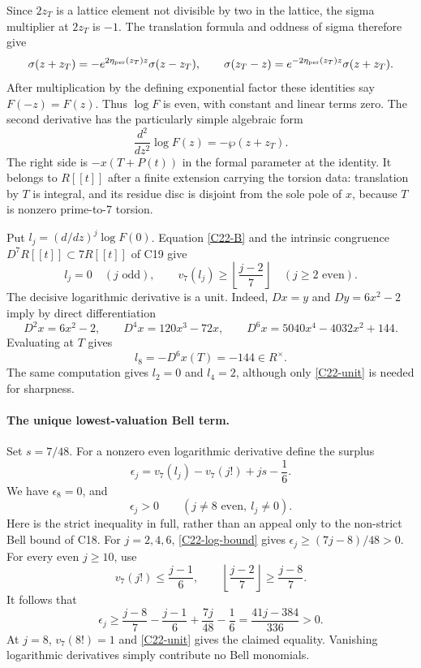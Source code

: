 Since $2z_T$ is a lattice element not divisible by two in the
lattice, the sigma multiplier at $2z_T$ is $-1$.
The translation formula and oddness of sigma therefore give
\[
 \sigma(z+z_T)
     =-e^{2\eta_{\rm per}(z_T)z}\sigma(z-z_T),
 \qquad
 \sigma(z_T-z)
     =e^{-2\eta_{\rm per}(z_T)z}\sigma(z+z_T).
\]
After multiplication by the defining exponential factor these
identities say $F(-z)=F(z)$.  Thus $\log F$ is even, with
constant and linear terms zero.
The second derivative has the particularly simple algebraic form
\begin{equation}\label{C22-B}
 \frac{d^2}{dz^2}\log F(z)=-\wp(z+z_T).
\end{equation}
The right side is $-x(T+P(t))$ in the formal parameter at the
identity.  It belongs to $R[[t]]$ after a finite extension
carrying the torsion data: translation by $T$ is integral,
and its residue disc is disjoint from the sole pole of $x$,
because $T$ is nonzero prime-to-7 torsion.

Put $l_j=(d/dz)^j\log F(0)$.  Equation \eqref{C22-B}
and the intrinsic congruence $D^7R[[t]]\subset7R[[t]]$ of
C19 give
\begin{equation}\label{C22-log-bound}
 l_j=0\quad(j\text{ odd}),\qquad
 v_7(l_j)\geq\left\lfloor\frac{j-2}{7}\right\rfloor
       \quad(j\geq2\text{ even}).
\end{equation}
The decisive logarithmic derivative is a unit.  Indeed,
$Dx=y$ and $Dy=6x^2-2$ imply by direct differentiation
\[
 D^2x=6x^2-2,\qquad
 D^4x=120x^3-72x,\qquad
 D^6x=5040x^4-4032x^2+144.
\]
Evaluating at $T$ gives
\begin{equation}\label{C22-unit}
 l_8=-D^6x(T)=-144\in R^\times.
\end{equation}
The same computation gives $l_2=0$ and $l_4=2$, although
only \eqref{C22-unit} is needed for sharpness.

\paragraph{The unique lowest-valuation Bell term.}
Set $s=7/48$.  For a nonzero even logarithmic derivative
define the surplus
\[
 \epsilon_j=v_7(l_j)-v_7(j!)+js-\frac16.
\]
We have $\epsilon_8=0$, and
\begin{equation}\label{C22-strict}
 \epsilon_j>0\qquad(j\ne8\text{ even},\ l_j\ne0).
\end{equation}
Here is the strict inequality in full, rather than an appeal
only to the non-strict Bell bound of C18.
For $j=2,4,6$, \eqref{C22-log-bound} gives
$\epsilon_j\geq(7j-8)/48>0$.
For every even $j\geq10$, use
\[
 v_7(j!)\leq\frac{j-1}{6},\qquad
 \left\lfloor\frac{j-2}{7}\right\rfloor
       \geq\frac{j-8}{7}.
\]
It follows that
\[
 \epsilon_j\geq
   \frac{j-8}{7}-\frac{j-1}{6}
          +\frac{7j}{48}-\frac16
      =\frac{41j-384}{336}>0.
\]
At $j=8$, $v_7(8!)=1$ and \eqref{C22-unit} gives the
claimed equality.  Vanishing logarithmic derivatives simply
contribute no Bell monomials.

